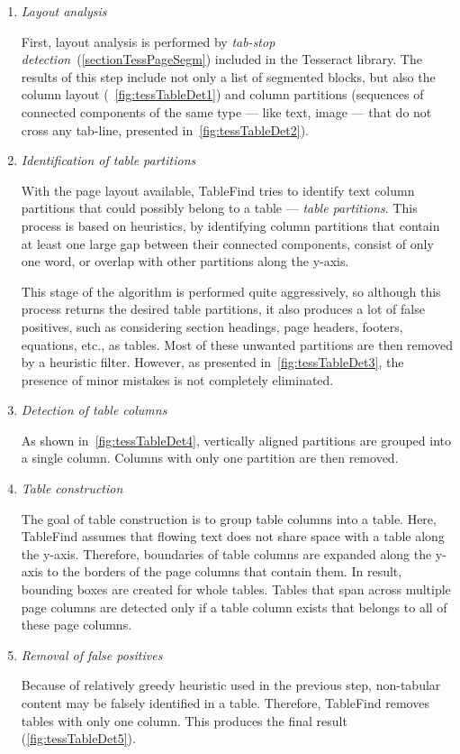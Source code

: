 \begin{enumerate}
\item \emph{Layout analysis}

First, layout analysis is performed by \emph{tab-stop detection}~(\cref{sectionTessPageSegm}) included in the Tesseract library. The results of this step include not only a list of segmented blocks, but also the column layout (~\cref{fig:tessTableDet1}) and column partitions (sequences of connected components of the same type --- like text, image --- that do not cross any tab-line, presented in~\cref{fig:tessTableDet2}).

\item \emph{Identification of table partitions}

With the page layout available, TableFind tries to identify text column partitions that could possibly belong to a table --- \emph{table partitions}. This process is based on heuristics, by identifying column partitions that contain at least one large gap between their connected components, consist of only one word, or overlap with other partitions along the y-axis.

This stage of the algorithm is performed quite aggressively, so although this process returns the desired table partitions, it also produces a lot of false positives, such as considering section headings, page headers, footers, equations, etc., as tables. Most of these unwanted partitions are then removed by a heuristic filter. However, as presented in~\cref{fig:tessTableDet3}, the presence of minor mistakes is not completely eliminated.

\item \emph{Detection of table columns}

As shown in~\cref{fig:tessTableDet4}, vertically aligned partitions are grouped into a single column. Columns with only one partition are then removed. 

\item \emph{Table construction}

The goal of table construction is to group table columns into a table. Here, TableFind assumes that flowing text does not share space with a table along the y-axis. Therefore, boundaries of table columns are expanded along the y-axis to the borders of the page columns that contain them. In result, bounding boxes are created for whole tables. Tables that span across multiple page columns are detected only if a table column exists that belongs to all of these page columns.

\item \emph{Removal of false positives}

Because of relatively greedy heuristic used in the previous step, non-tabular content may be falsely identified in a table. Therefore, TableFind removes tables with only one column. This produces the final result (\cref{fig:tessTableDet5}).

\end{enumerate}

